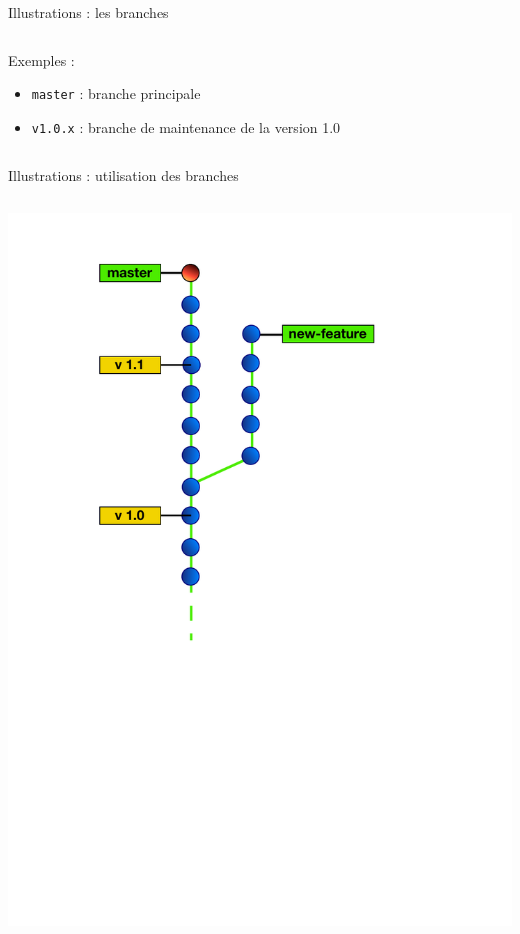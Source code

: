 \begin{frame}[fragile]{%
\protect\hypertarget{illustrations-les-branches}{%
Illustrations : les branches}}
\begin{columns}[T]
\begin{column}{0.60\textwidth}
Exemples :

\begin{itemize}
\tightlist
\item
  \texttt{master} : branche principale
\item
  \texttt{v1.0.x} : branche de maintenance de la version 1.0
\end{itemize}
\end{column}
\end{columns}

\end{frame}

\begin{frame}[fragile]{%
\protect\hypertarget{illustrations-utilisation-des-branches}{%
Illustrations : utilisation des branches}}

\begin{columns}[T]
\begin{column}{0.40\textwidth}
\includegraphics[height=1.5\textwidth]{images/feature.pdf}
\end{column}


\end{columns}
\end{frame}

